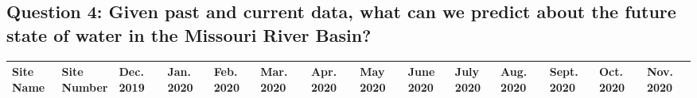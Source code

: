 \documentclass[12pt,]{article}
\begin{document}
\hypertarget{question-4-given-past-and-current-data-what-can-we-predict-about-the-future-state-of-water-in-the-missouri-river-basin}{%
\subsection{Question 4: Given past and current data, what can we predict
about the future state of water in the Missouri River
Basin?}\label{question-4-given-past-and-current-data-what-can-we-predict-about-the-future-state-of-water-in-the-missouri-river-basin}}

\begin{longtable}[]{@{}llllllllllllll@{}}
\toprule
\begin{minipage}[b]{0.05\columnwidth}\raggedright
Site Name\strut
\end{minipage} & \begin{minipage}[b]{0.06\columnwidth}\raggedright
Site Number\strut
\end{minipage} & \begin{minipage}[b]{0.05\columnwidth}\raggedright
Dec.~2019\strut
\end{minipage} & \begin{minipage}[b]{0.04\columnwidth}\raggedright
Jan.~2020\strut
\end{minipage} & \begin{minipage}[b]{0.05\columnwidth}\raggedright
Feb.~2020\strut
\end{minipage} & \begin{minipage}[b]{0.05\columnwidth}\raggedright
Mar.~2020\strut
\end{minipage} & \begin{minipage}[b]{0.05\columnwidth}\raggedright
Apr.~2020\strut
\end{minipage} & \begin{minipage}[b]{0.04\columnwidth}\raggedright
May 2020\strut
\end{minipage} & \begin{minipage}[b]{0.05\columnwidth}\raggedright
June 2020\strut
\end{minipage} & \begin{minipage}[b]{0.05\columnwidth}\raggedright
July 2020\strut
\end{minipage} & \begin{minipage}[b]{0.05\columnwidth}\raggedright
Aug.~2020\strut
\end{minipage} & \begin{minipage}[b]{0.05\columnwidth}\raggedright
Sept.~2020\strut
\end{minipage} & \begin{minipage}[b]{0.04\columnwidth}\raggedright
Oct.~2020\strut
\end{minipage} & \begin{minipage}[b]{0.04\columnwidth}\raggedright
Nov.~2020\strut
\end{minipage}\tabularnewline
\midrule
\endhead
\bottomrule
\end{longtable}
\end{document}
